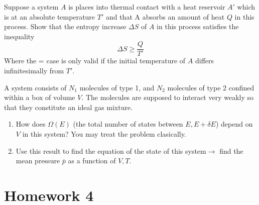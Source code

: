 \documentclass{article}
\begin{document}
    \begin{problem}[Reif 3.4]
        Suppose a system $A$ is places into thermal contact with a heat reservoir $A'$ which is at an absolute temperature $T'$ and that A absorbs an amount of heat $Q$ in this process. Show that the entropy increase $\Delta S$ of $A$ in this process satisfies the inequality $$\Delta S \geq \frac{Q}{T'}$$ Where the = case is only valid if the initial temperature of $A$ differs infinitesimally from $T'$. 
        \answerline
    \end{problem}\newpage
    \begin{problem}[Reif 3.5]
        A system consists of $N_1$ molecules of type 1, and $N_2$ molecules of type 2 confined within a box of volume $V$. The molecules are supposed to interact very weakly so that they constitute an ideal gas mixture. 
        \begin{enumerate}[label=(\alph*)]
            \item How does $\Omega(E)$ (the total number of states between $E,E+\delta E$) depend on $V$ in this system? You may treat the problem clasically. 
            \item Use this result to find the equation of the state of this system$\rightarrow$ find the mean pressure $\overline{p}$ as a function of $V,T$.
        \end{enumerate}
        \answerline
    \end{problem}
\section{Homework 4}
    
\end{document}
